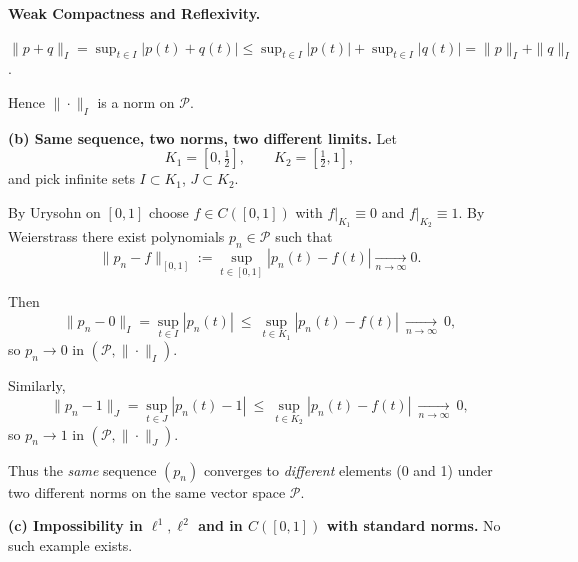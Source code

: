 \begin{problem}[CP-II-0484]
\label{prob:cp-ii-0484}
\textbf{Weak Compactness and Reflexivity.}

\hspace*{1.5em}$\|p+q\|_{I}=\sup_{t\in I}|p(t)+q(t)|\le \sup_{t\in I}|p(t)|+\sup_{t\in I}|q(t)|=\|p\|_{I}+\|q\|_{I}$.

Hence $\|\cdot\|_{I}$ is a norm on $\mathcal{P}$.

\bigskip
\par\medskip\noindent\textbf{(b) Same sequence, two norms, two different limits.}\quad
Let
\[
K_1=[0,\tfrac12],\qquad K_2=[\tfrac12,1],
\]
and pick infinite sets $I\subset K_1$, $J\subset K_2$.

By Urysohn on $[0,1]$ choose $f\in C([0,1])$ with $f|_{K_1}\equiv0$ and $f|_{K_2}\equiv1$.
By Weierstrass there exist polynomials $p_n\in\mathcal{P}$ such that
\[
\|p_n-f\|_{[0,1]}:=\sup_{t\in[0,1]}|p_n(t)-f(t)| \xrightarrow[n\to\infty]{} 0.
\]

Then
\[
\|p_n-0\|_{I}=\sup_{t\in I}|p_n(t)|
\ \le\ \sup_{t\in K_1}|p_n(t)-f(t)|
\ \xrightarrow[n\to\infty]{}\ 0,
\]
so $p_n\to 0$ in $(\mathcal{P},\|\cdot\|_{I})$.

Similarly,
\[
\|p_n-1\|_{J}=\sup_{t\in J}|p_n(t)-1|
\ \le\ \sup_{t\in K_2}|p_n(t)-f(t)|
\ \xrightarrow[n\to\infty]{}\ 0,
\]
so $p_n\to 1$ in $(\mathcal{P},\|\cdot\|_{J})$.

\medskip
\noindent
Thus the \emph{same} sequence $(p_n)$ converges to \emph{different} elements (0 and 1) under two different norms on the same vector space $\mathcal{P}$.

\bigskip
\par\medskip\noindent\textbf{(c) Impossibility in $\ell^1,\ell^2$ and in $C([0,1])$ with standard norms.}\quad
No such example exists.
\end{problem}

